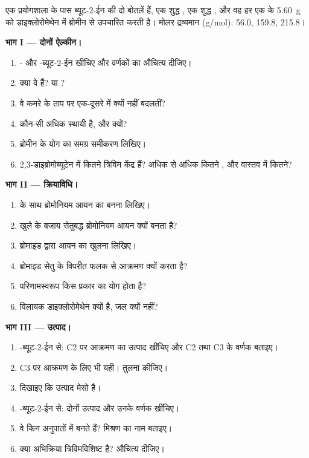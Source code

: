\begin{problem}
\label{pb:b1:electrophilic-additions:1}
एक प्रयोगशाला के पास ब्यूट-2-ईन की दो बोतलें हैं, एक शुद्ध , एक शुद्ध
, और वह हर एक के \qty{5.60}{g} को डाइक्लोरोमेथेन में ब्रोमीन से
उपचारित करती है। मोलर द्रव्यमान (\unit{g/mol}):  56.0, 
159.8,  215.8।

\medskip
\noindent\textbf{भाग I --- दोनों ऐल्कीन।}
\begin{enumerate}
  \item {}- और -ब्यूट-2-ईन खींचिए और वर्णकों का औचित्य दीजिए।
  \item क्या वे  हैं?  या ?
  \item वे कमरे के ताप पर एक-दूसरे में क्यों नहीं बदलतीं?
  \item कौन-सी अधिक स्थायी है, और क्यों?
  \item ब्रोमीन के योग का समग्र समीकरण लिखिए।
  \item 2,3-डाइब्रोमोब्यूटेन में कितने त्रिविम केंद्र हैं? अधिक से अधिक कितने
        , और वास्तव में कितने?
\end{enumerate}

\medskip
\noindent\textbf{भाग II --- क्रियाविधि।}
\begin{enumerate}[resume]
  \item {} के साथ ब्रोमोनियम आयन का बनना लिखिए।
  \item खुले  के बजाय सेतुबद्ध ब्रोमोनियम आयन क्यों बनता
        है?
  \item ब्रोमाइड द्वारा आयन का खुलना लिखिए।
  \item ब्रोमाइड सेतु के विपरीत फलक से आक्रमण क्यों करता है?
  \item परिणामस्वरूप किस प्रकार का योग होता है?
  \item विलायक डाइक्लोरोमेथेन क्यों है, जल क्यों नहीं?
\end{enumerate}

\medskip
\noindent\textbf{भाग III --- उत्पाद।}
\begin{enumerate}[resume]
  \item {}-ब्यूट-2-ईन से: C2 पर आक्रमण का उत्पाद खींचिए और
        C2 तथा C3 के वर्णक बताइए।
  \item C3 पर आक्रमण के लिए भी यही। तुलना कीजिए।
  \item दिखाइए कि उत्पाद मेसो है।
  \item {}-ब्यूट-2-ईन से: दोनों उत्पाद और उनके
        वर्णक खींचिए।
  \item वे किन अनुपातों में बनते हैं? मिश्रण का नाम बताइए।
  \item क्या अभिक्रिया त्रिविमविशिष्ट है? औचित्य दीजिए।
\end{enumerate}


\end{problem}
